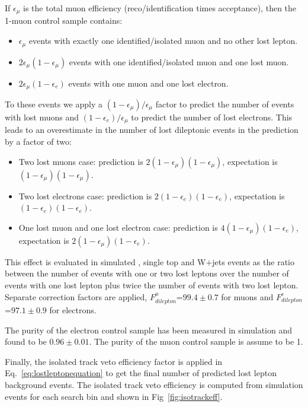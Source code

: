 If $\epsilon_{\mu}$ is the total muon efficiency 
(reco/identification times acceptance), then the 1-muon control sample contains:
\begin{itemize}
\item $\epsilon_{\mu}$ events with exactly one identified/isolated muon and 
no other lost lepton.
\item $2\epsilon_{\mu}(1-\epsilon_{\mu})$ events with one identified/isolated 
muon and one lost muon.
\item $2\epsilon_{\mu}(1-\epsilon_{e})$ events with one muon and one 
lost electron.
\end{itemize}
To these events we apply a $(1-\epsilon_{\mu})/\epsilon_{\mu}$ factor to
predict the number of events with  
lost muons and  $(1-\epsilon_{e})/\epsilon_{\mu}$ to predict the
number of lost electrons.
This leads to an overestimate in the number of lost dileptonic events in the 
prediction by a factor of two:
\begin{itemize}
\item Two lost muons case: prediction is 
$2(1-\epsilon_{\mu})(1-\epsilon_{\mu})$, expectation 
is $(1-\epsilon_{\mu})(1-\epsilon_{\mu})$.
\item Two lost electrons case: prediction is 
$2(1-\epsilon_{e})(1-\epsilon_{e})$, 
expectation is $(1-\epsilon_{e})(1-\epsilon_{e})$.
\item One lost muon and one lost electron case: prediction is
$4(1-\epsilon_{\mu})(1-\epsilon_{e})$, 
expectation is $2(1-\epsilon_{\mu})(1-\epsilon_{e})$.
\end{itemize}
This effect is evaluated in  
simulated \ttbar, single top and W$+$jets events as the ratio between the number of events 
with one or two lost leptons over the number of events with one lost 
lepton plus twice the number of events with two lost lepton. 
Separate correction factors are applied,  
$F_{dilepton}^{\mu}$=$99.4\pm0.7$ for muons and 
$F_{dilepton}^{e}$=$97.1\pm0.9$ for electrons.

The purity of the electron control sample has been measured in simulation and found to be $0.96\pm0.01$. The purity of the muon control sample is assume to be 1.

Finally, the isolated track veto efficiency factor is applied in 
Eq.~\ref{eq:lostleptonequation}
to get the final number of predicted lost lepton background events.
The isolated track veto efficiency is computed from simulation events 
for each search bin and shown in Fig~\ref{fig:isotrackeff}.

